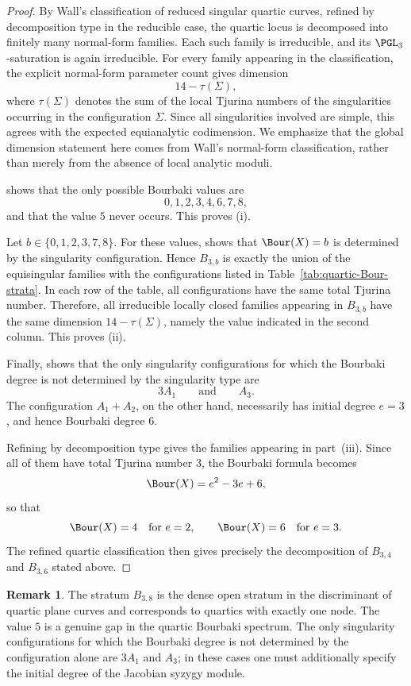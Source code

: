 \documentclass[11pt]{amsart} %
\theoremstyle{definition}
\newtheorem{Remark}[Theorem]{Remark}
\begin{document}
\begin{proof}
By Wall's classification of reduced singular quartic curves, refined
by decomposition type in the reducible case, the quartic locus is
decomposed into finitely many normal-form families. Each such family
is irreducible, and its $\PGL_3$-saturation is again irreducible.
For every family appearing in the classification, the explicit
normal-form parameter count gives dimension
\[
14-\tau(\Sigma),
\]
where $\tau(\Sigma)$ denotes the sum of the local Tjurina numbers of
the singularities occurring in the configuration $\Sigma$.
Since all singularities involved are simple, this agrees with the
expected equianalytic codimension. We emphasize that the global
dimension statement here comes from Wall's normal-form
classification, rather than merely from the absence of local analytic
moduli.

\cite[Theorem~4.1]{JMNRS2026} shows that the only possible Bourbaki values are
\[
0,1,2,3,4,6,7,8,
\]
and that the value $5$ never occurs. This proves \rm(i).

Let $b\in\{0,1,2,3,7,8\}$. For these values, \cite[Theorem~4.1]{JMNRS2026} shows that $\Bour(X)=b$ is determined by the singularity configuration. Hence $B_{3,b}$ is exactly the union of the equisingular families with the configurations listed in Table~\ref{tab:quartic-Bour-strata}. In each row of the table, all configurations have the same total Tjurina number. Therefore, all irreducible locally closed families appearing in $B_{3,b}$ have the same dimension $14-\tau(\Sigma)$, namely the value indicated in the second column. This proves \rm(ii).

Finally, \cite[Theorem~4.1]{JMNRS2026} shows that the only
singularity configurations for which the Bourbaki degree is not
determined by the singularity type are
\[
3A_1
\qquad\text{and}\qquad
A_3.
\]
The configuration $A_1+A_2$, on the other hand, necessarily has
initial degree $e=3$, and hence Bourbaki degree $6$.

Refining by decomposition type gives the families appearing in
part~(iii). Since all of them have total Tjurina number $3$, the
Bourbaki formula becomes
\[
\Bour(X)=e^2-3e+6,
\]
so that
\[
\Bour(X)=4 \quad\text{for }e=2,
\qquad
\Bour(X)=6 \quad\text{for }e=3.
\]
The refined quartic classification then gives precisely the
decomposition of $B_{3,4}$ and $B_{3,6}$ stated above.
\end{proof}

\begin{Remark}
The stratum $B_{3,8}$ is the dense open stratum in the discriminant
of quartic plane curves and corresponds to quartics with exactly one node. The value $5$ is a genuine gap in the quartic Bourbaki spectrum.
The only singularity configurations for which the Bourbaki degree is
not determined by the configuration alone are $3A_1$ and $A_3$; in
these cases one must additionally specify the initial degree of the
Jacobian syzygy module.
\end{Remark}
\end{document}
